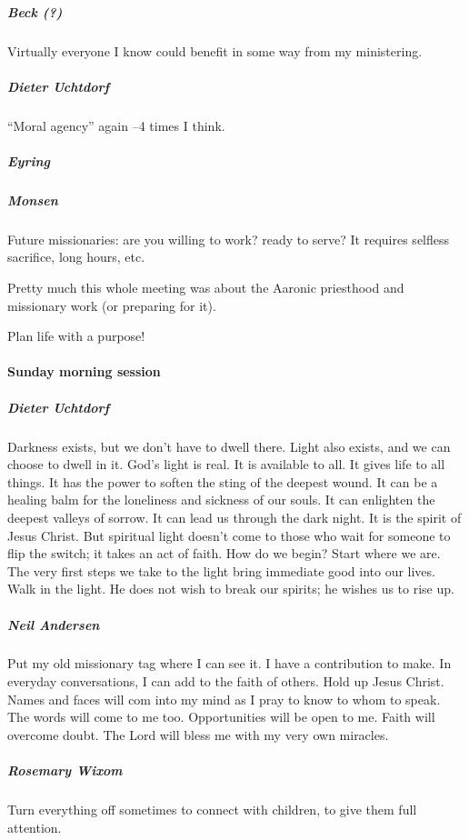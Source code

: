 \subparagraph*{Beck (?)} Virtually everyone I know could benefit in some way from my ministering.

\subparagraph*{Dieter Uchtdorf} ``Moral agency'' again --4 times I think.

\subparagraph*{Eyring}

\subparagraph*{Monsen} Future missionaries: are you willing to work? ready to serve? It requires selfless sacrifice, long hours, etc.

Pretty much this whole meeting was about the Aaronic priesthood and missionary work (or preparing for it).

Plan life with a purpose!

\paragraph*{Sunday morning session}

\subparagraph*{Dieter Uchtdorf} Darkness exists, but we don't have to dwell there. Light also exists, and we can choose to dwell in it. God's light is real. It is available to all. It gives life to all things. It has the power to soften the sting of the deepest wound. It can be a healing balm for the loneliness and sickness of our souls. It can enlighten the deepest valleys of sorrow. It can lead us through the dark night. It is the spirit of Jesus Christ. But spiritual light doesn't come to those who wait for someone to flip the switch; it takes an act of faith. How do we begin? Start where we are. The very first steps we take to the light bring immediate good into our lives. Walk in the light. He does not wish to break our spirits; he wishes us to rise up.

\subparagraph*{Neil Andersen} Put my old missionary tag where I can see it. I have a contribution to make. In everyday conversations, I can add to the faith of others. Hold up Jesus Christ. Names and faces will com into my mind as I pray to know to whom to speak. The words will come to me too. Opportunities will be open to me. Faith will overcome doubt. The Lord will bless me with my very own miracles.

\subparagraph*{Rosemary Wixom} Turn everything off sometimes to connect with children, to give them full attention.

